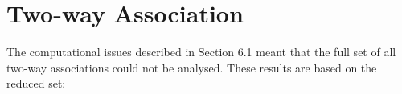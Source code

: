 \documentclass[a4paper, 12pt]{report}
\begin{document}
%
%

\section{Two-way Association}
The computational issues described in Section 6.1 meant that the full set of all two-way associations could not be analysed. These results are based on the reduced set:
\end{document}

